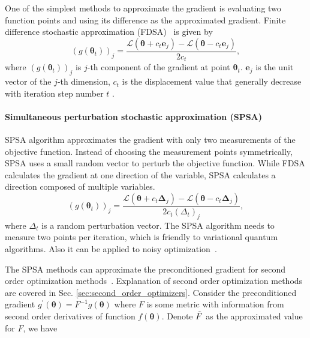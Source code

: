 One of the simplest methods to approximate the gradient is evaluating two function points and using its difference as the approximated gradient. Finite difference stochastic approximation (FDSA)~\cite{kiefer_stochastic_1952} is given by
\begin{equation}
    ({g}(\boldsymbol{\theta}_{t}))_{j}
        =
        {\frac {    \mathcal{L}(\boldsymbol{\theta}+c_{t}\mathbf{e}_{j})    -    \mathcal{L}(\boldsymbol{\theta}-c_{t}\mathbf{e}_{j})    }
        {2c_{t}}},
\end{equation}
where $({g}(\boldsymbol{\theta}_{t}))_{j}$ is $j$-th component of the gradient at point $\boldsymbol{\theta}_t$. $\mathbf{e}_j$ is the unit vector of the $j$-th dimension, $c_t$ is the displacement value that generally decrease with iteration step number $t$ \cite{kiefer_stochastic_1952}.%

\paragraph{Simultaneous perturbation stochastic approximation (SPSA)}

SPSA algorithm approximates the gradient with only two measurements of the objective function. Instead of choosing the measurement points symmetrically, SPSA uses a small random vector to perturb the objective function. While FDSA calculates the gradient at one direction of the variable, SPSA calculates a direction composed of multiple variables.
\begin{equation}
    ({g}(\boldsymbol{\theta}_{t}))_{j}
        =
        {\frac {    \mathcal{L}(\boldsymbol{\theta}+c_{t}\mathbf{\Delta}_{j})    -    \mathcal{L}(\boldsymbol{\theta}-c_{t}\mathbf{\Delta}_{j})    }
        {2c_{t}(\Delta_t)_j}},
\end{equation}
where $\Delta_t$ is a random perturbation vector. The SPSA algorithm needs to measure two points per iteration, which is friendly to variational quantum algorithms. Also it can be applied to noisy optimization~\cite{s_performance_2012,morison_spsa_2003,wang_mixed_2018}. 

The SPSA methods can approximate the preconditioned gradient for second order optimization methods~\cite{Spall1997AcceleratedMeasurements}. Explanation of second order optimization methods are covered in Sec. \ref{sec:second_order_optimizers}. Consider the preconditioned gradient $g^\prime(\boldsymbol{\theta}) = F^{-1} g(\boldsymbol{\theta})$ where $F$ is some metric with information from second order derivatives of function $f(\boldsymbol{\theta})$. Denote $\Tilde{F}$ as the approximated value for $F$, we have

